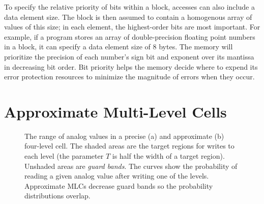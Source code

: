 To specify the relative
priority of bits within a block, accesses can also include a data
element size. The block is then assumed to contain a homogenous
array of values of this size; in each element, the highest-order bits
are most important. For example, if a program
stores an array of double-precision floating point numbers in a block,
it can specify a data element size of 8 bytes. The memory will
prioritize the precision of each number's sign bit and exponent over
its mantissa in decreasing bit order. Bit priority
helps the memory decide where to expend its error protection
resources to minimize the magnitude of errors when they occur.

\section{Approximate Multi-Level Cells}
\label{approxstorage:sec:amlc}

\begin{figure}
    \centering
    \caption{
        The range of analog values in a precise (a) and approximate (b) four-level cell. The shaded areas are
        the target regions for writes to each level (the parameter $T$ is half
        the width of a target region). Unshaded areas are
        \emph{guard bands}. The curves show the probability of reading a given
        analog value after writing one of the levels. Approximate  MLCs
        decrease guard bands so the probability distributions overlap.
    }
    \label{approxstorage:fig:mlc}
\end{figure}

